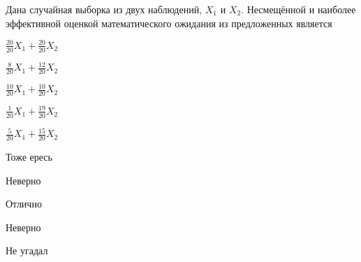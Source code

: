 
\begin{question}
Дана случайная выборка из двух наблюдений, \(X_1\) и \(X_2\).
Несмещённой и наиболее эффективной оценкой математического ожидания из
предложенных является
\begin{answerlist}
  \item \(\frac{20}{20}X_1 + \frac{20}{20}X_2\)
  \item \(\frac{8}{20}X_1 + \frac{12}{20}X_2\)
  \item \(\frac{10}{20}X_1 + \frac{10}{20}X_2\)
  \item \(\frac{1}{20}X_1 + \frac{19}{20}X_2\)
  \item \(\frac{5}{20}X_1 + \frac{15}{20}X_2\)
\end{answerlist}
\end{question}

\begin{solution}
\begin{answerlist}
  \item Тоже ересь
  \item Неверно
  \item Отлично
  \item Неверно
  \item Не угадал
\end{answerlist}
\end{solution}
